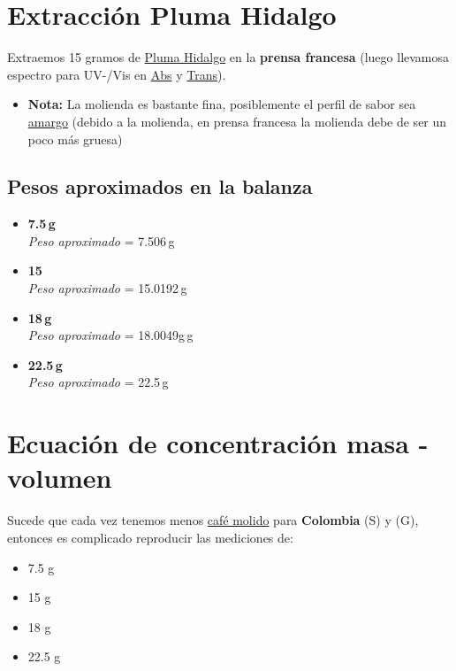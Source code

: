 \documentclass{article}
\begin{document}
\section{Extracción Pluma Hidalgo}

Extraemos 15 gramos de \underline{Pluma Hidalgo} en la \textbf{prensa francesa} (luego llevamosa  espectro para UV-/Vis en \underline{Abs} y \underline{Trans}).

\begin{itemize}
\item[$\bullet$] \textbf{Nota:} La molienda es bastante fina, posiblemente el perfil de sabor sea \underline{amargo} (debido a la molienda, en prensa francesa la molienda debe de ser un poco más gruesa)
\end{itemize}

\subsection{Pesos aproximados en la balanza}

\begin{itemize}
\item[$\bullet$] \textbf{7.5\,g}\\
\textit{Peso aproximado} = 7.506\,g\\
\item[$\bullet$] \textbf{15\,}\\
\textit{Peso aproximado} = 15.0192\,g\\
\item[$\bullet$] \textbf{18\,g}\\
\textit{Peso aproximado} = 18.0049g\,g \\
\item[$\bullet$] \textbf{22.5\,g}\\
\textit{Peso aproximado} = 22.5\,g
\end{itemize}


\section{Ecuación de concentración masa - volumen}

Sucede que cada vez tenemos menos \underline{café molido} para \textbf{Colombia} (S) y (G), entonces es complicado reproducir las mediciones de:

\begin{itemize}
\item[$\bullet$] 7.5 g
\item[$\bullet$] 15 g
\item[$\bullet$] 18 g
\item[$\bullet$] 22.5 g
\end{itemize}
\end{document}
